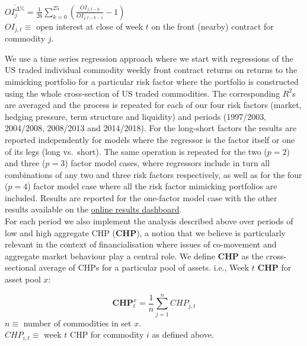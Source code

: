 \documentclass[]{elsarticle} %
\begin{document}
\(\overline{{OI}_{j}^{\Delta \%}}=\frac{1}{26}\sum_{k=0}^{25}(\frac{{OI}_{j,t-k}}{{OI}_{j,t-k-1}} - 1)\)\\
\(OI_{j,t}\equiv\) open interest at close of week \(t\) on the front (nearby) contract for commodity \(j\).

\bigskip

We use a time series regression approach where we start with regressions of the US traded individual commodity weekly front contract returns on returns to the mimicking portfolio for a particular risk factor where the portfolio is constructed using the whole cross-section of US traded commodities. The corresponding \(R^{2}\)s are averaged and the process is repeated for each of our four risk factors (market, hedging pressure, term structure and liquidity) and periods (1997/2003, 2004/2008, 2008/2013 and 2014/2018). For the long-short factors the results are reported independently for models where the regressor is the factor itself or one of its legs (long vs.~short). The same operation is repeated for the two (\(p=2\)) and three (\(p=3\)) factor model cases, where regressors include in turn all combinations of any two and three risk factors respectively, as well as for the four (\(p=4\)) factor model case where all the risk factor mimicking portfolios are included. Results are reported for the one-factor model case with the other results available on the \href{http://18.135.131.217:3838/financialization-asset-pricing/}{online results dashboard}.\\
For each period we also implement the analysis described above over periods of low and high aggregate CHP (\textbf{CHP}), a notion that we believe is particularly relevant in the context of financialisation where issues of co-movement and aggregate market behaviour play a central role. We define \textbf{CHP} as the cross-sectional average of CHPs for a particular pool of assets. i.e., Week \(t\) \textbf{CHP} for asset pool \(x\):

\[\mathbf{CHP}_{t}^{x}=\frac{1}{n}\sum_{j=1}^{n}CHP_{j,t}\]
\(n\equiv\) number of commodities in set \(x\).\\
\(CHP_{i,t}\equiv\) week \(t\) CHP for commodity \(i\) as defined above.

\bigskip
\end{document}
